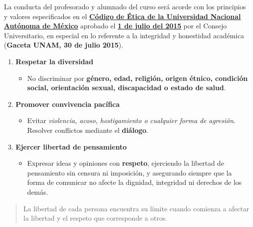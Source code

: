 \documentclass[
  spanish,
  12pt,
  letterpaper,
  DIV=11,
  numbers=noendperiod]{scrreprt}
\providecommand{\tightlist}{%
  \setlength{\itemsep}{0pt}\setlength{\parskip}{0pt}}
\begin{document}
La conducta del profesorado y alumnado del curso será acorde con los
principios y valores especificados en el
\href{https://www.enesjuriquilla.unam.mx/?page_id=10507}{\textbf{Código
de Ética de la Universidad Nacional Autónoma de México}} aprobado el
\href{https://www.enesjuriquilla.unam.mx/wp-content/uploads/2022/04/codigo-etica-unam.pdf}{\textbf{1
de julio del 2015}} por el Consejo Universitario, en especial en lo
referente a la integridad y honestidad académica ({\textbf{Gaceta UNAM,
30 de julio 2015}}).

\begin{enumerate}
\def\labelenumi{\arabic{enumi}.}
\tightlist
\item
  \textbf{Respetar la diversidad}

  \begin{itemize}
  \tightlist
  \item
    No discriminar por \textbf{género, edad, religión, origen étnico,
    condición social, orientación sexual, discapacidad o estado de
    salud}.
  \end{itemize}
\item
  \textbf{Promover convivencia pacífica}

  \begin{itemize}
  \tightlist
  \item
    Evitar \emph{violencia, acoso, hostigamiento o cualquier forma de
    agresión}. Resolver conflictos mediante el \textbf{diálogo}.
  \end{itemize}
\item
  \textbf{Ejercer libertad de pensamiento}

  \begin{itemize}
  \tightlist
  \item
    Expresar ideas y opiniones con \textbf{respeto}, ejerciendo la
    libertad de pensamiento sin censura ni imposición, y asegurando
    siempre que la forma de comunicar no afecte la dignidad, integridad
    ni derechos de los demás.
  \end{itemize}
\end{enumerate}

\begin{quote}
La libertad de cada persona encuentra su límite cuando comienza a
afectar la libertad y el respeto que corresponde a otros.
\end{quote}
\end{document}
